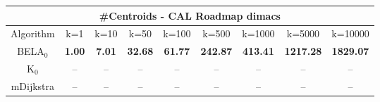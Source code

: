 \begin{tabular}{c|cccccccc}\toprule
\multicolumn{9}{c}{#Centroids - CAL Roadmap dimacs}\\ \midrule
Algorithm & k=1 & k=10 & k=50 & k=100 & k=500 & k=1000 & k=5000 & k=10000 \\ \midrule
BELA$_0$ & \textbf{1.00} & \textbf{7.01} & \textbf{32.68} & \textbf{61.77} & \textbf{242.87} & \textbf{413.41} & \textbf{1217.28} & \textbf{1829.07} \\
K$_0$ & -- & -- & -- & -- & -- & -- & -- & -- \\
mDijkstra & -- & -- & -- & -- & -- & -- & -- & -- \\ \bottomrule 
\end{tabular}

